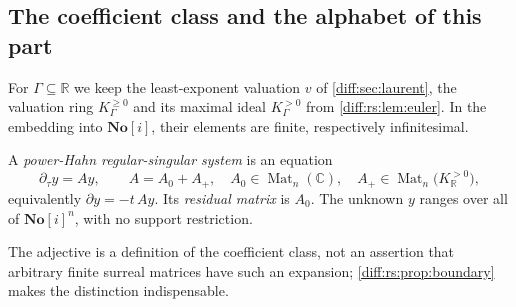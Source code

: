 \documentclass[11pt,letterpaper]{article}
\numberwithin{equation}{section}
\theoremstyle{definition}
\theoremstyle{remark}
\newcommand{\SC}{\mathbf{No}[i]}
\newcommand{\R}{\mathbb R}
\newcommand{\C}{\mathbb C}
\newcommand{\der}{\partial}
\newcommand{\Mat}{\operatorname{Mat}}
\newcommand{\derT}{\der_{\tau}}
\newcommand{\KR}{K_{\R}}
\begin{document}
\subsection{The coefficient class and the alphabet of this part}
\label{diff:rs:sub:class}

For $\Gamma\subseteq\R$ we keep the least-exponent valuation $v$ of
\cref{diff:sec:laurent}, the valuation ring $K_{\Gamma}^{\geq0}$ and its
maximal ideal $K_{\Gamma}^{>0}$ from \cref{diff:rs:lem:euler}. In the
embedding into $\SC$, their elements are finite, respectively infinitesimal.

\begin{definition}
\label{diff:rs:def:class}
A \emph{power-Hahn regular-singular system} is an equation
\begin{equation}\label{diff:rs:eq:system}
 \derT y=Ay,
 \qquad A=A_{0}+A_{+},
 \quad A_{0}\in\Mat_{n}(\C),
 \quad A_{+}\in\Mat_{n}\bigl(\KR^{>0}\bigr),
\end{equation}
equivalently $\der y=-t\,Ay$. Its \emph{residual matrix} is $A_{0}$. The unknown
$y$ ranges over all of $\SC^{n}$, with no support restriction.
\end{definition}

The adjective is a definition of the coefficient class, not an assertion that
arbitrary finite surreal matrices have such an expansion;
\cref{diff:rs:prop:boundary} makes the distinction indispensable.
\end{document}
